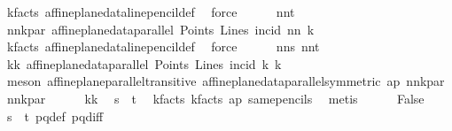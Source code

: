 \begin{isabellebody}
\ k{}{\isacharunderscore}{\kern0pt}facts\ affine{\isacharunderscore}{\kern0pt}plane{\isacharunderscore}{\kern0pt}data{\isachardot}{\kern0pt}line{\isacharunderscore}{\kern0pt}pencil{\isacharunderscore}{\kern0pt}def\ \isamarkupfalse%
\ force\isanewline
\ \ \ \ \isamarkupfalse%
\ nnt\ \isamarkupfalse%
\ nn{\isacharunderscore}{\kern0pt}k{}{\isacharunderscore}{\kern0pt}par{\isacharcolon}{\kern0pt}\ {\isachardoublequoteopen}affine{\isacharunderscore}{\kern0pt}plane{\isacharunderscore}{\kern0pt}data{\isachardot}{\kern0pt}parallel\ Points\ Lines\ {\isacharparenleft}{\kern0pt}incid{\isacharparenright}{\kern0pt}\ nn\ k{}{\isachardoublequoteclose}\ \isamarkupfalse%
\ k{}{\isacharunderscore}{\kern0pt}facts\ affine{\isacharunderscore}{\kern0pt}plane{\isacharunderscore}{\kern0pt}data{\isachardot}{\kern0pt}line{\isacharunderscore}{\kern0pt}pencil{\isacharunderscore}{\kern0pt}def\ \isamarkupfalse%
\ force\isanewline
\ \ \ \ \isamarkupfalse%
\ nns\ nnt\ \isamarkupfalse%
\ k{}k{}{\isacharcolon}{\kern0pt}\ {\isachardoublequoteopen}affine{\isacharunderscore}{\kern0pt}plane{\isacharunderscore}{\kern0pt}data{\isachardot}{\kern0pt}parallel\ Points\ Lines\ {\isacharparenleft}{\kern0pt}incid{\isacharparenright}{\kern0pt}\ k{}\ k{}{\isachardoublequoteclose}\ \isanewline
\ \ \ \ \ \ \isamarkupfalse%
\ {\isacharparenleft}{\kern0pt}meson\ affine{\isacharunderscore}{\kern0pt}plane{\isachardot}{\kern0pt}parallel{\isacharunderscore}{\kern0pt}transitive\ affine{\isacharunderscore}{\kern0pt}plane{\isacharunderscore}{\kern0pt}data{\isachardot}{\kern0pt}parallel{\isacharunderscore}{\kern0pt}symmetric\ ap\ nn{\isacharunderscore}{\kern0pt}k{}{\isacharunderscore}{\kern0pt}par\ nn{\isacharunderscore}{\kern0pt}k{}{\isacharunderscore}{\kern0pt}par{\isacharparenright}{\kern0pt}\isanewline
\ \ \ \ \isamarkupfalse%
\ k{}k{}\ \isamarkupfalse%
\ {\isachardoublequoteopen}s\ {\isacharequal}{\kern0pt}\ t{\isachardoublequoteclose}\ \isamarkupfalse%
\ k{}{\isacharunderscore}{\kern0pt}facts\ k{}{\isacharunderscore}{\kern0pt}facts\ ap\ same{\isacharunderscore}{\kern0pt}pencils\ \isamarkupfalse%
\ metis\isanewline
\ \ \ \ \isamarkupfalse%
\ False\ \ \isamarkupfalse%
\ {\isacartoucheopen}s\ {\isacharequal}{\kern0pt}\ t{\isacartoucheclose}\ pq{\isacharunderscore}{\kern0pt}def\ pq{\isacharunderscore}{\kern0pt}diff\ \isamarkupfalse%

\end{isabellebody}
